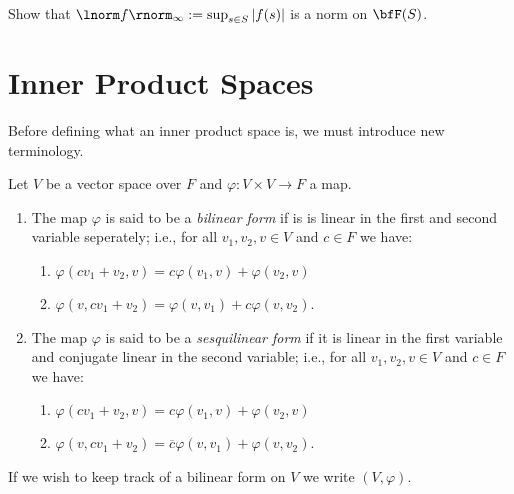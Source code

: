 \begin{example}
\begin{enumerate}[label = (\arabic*),itemsep=1pt,topsep=3pt]
                \begin{exercise}
                    Show that $\lnorm f \rnorm_\infty := \sup_{s \in S}|f(s)|$ is a norm on $\bfF(S)$.
                \end{exercise}
        \end{enumerate}
    \end{example}

\section{Inner Product Spaces}
    Before defining what an inner product space is, we must introduce new terminology.

    \begin{definition}
        Let $V$ be a vector space over $F$ and $\varphi:V \times V \rightarrow F$ a map.
            \begin{enumerate}[label = (\arabic*)]
                \item The map $\varphi$ is said to be a \textit{bilinear form} if is is linear in the first and second variable seperately; i.e., for all $v_1,v_2,v \in V$ and $c \in F$ we have:
                    \begin{enumerate}[label = (\roman*)]
                        \item $\varphi(cv_1 +v_2,v) = c\varphi(v_1,v) + \varphi(v_2,v)$
                        \item $\varphi(v,cv_1 + v_2) = \varphi(v,v_1) + c\varphi(v,v_2)$.
                    \end{enumerate}

                \item The map $\varphi$ is said to be a \textit{sesquilinear form} if it is linear in the first variable and conjugate linear in the second variable; i.e., for all $v_1,v_2,v \in V$ and $c \in F$ we have:
                    \begin{enumerate}[label = (\roman*)]
                        \item $\varphi(cv_1 +v_2,v) = c\varphi(v_1,v) + \varphi(v_2,v)$
                        \item $\varphi(v,cv_1 + v_2) = \overline{c}\varphi(v,v_1) + \varphi(v,v_2)$.
                    \end{enumerate}
            \end{enumerate}
        If we wish to keep track of a bilinear form on $V$ we write $(V,\varphi)$.
    \end{definition}

